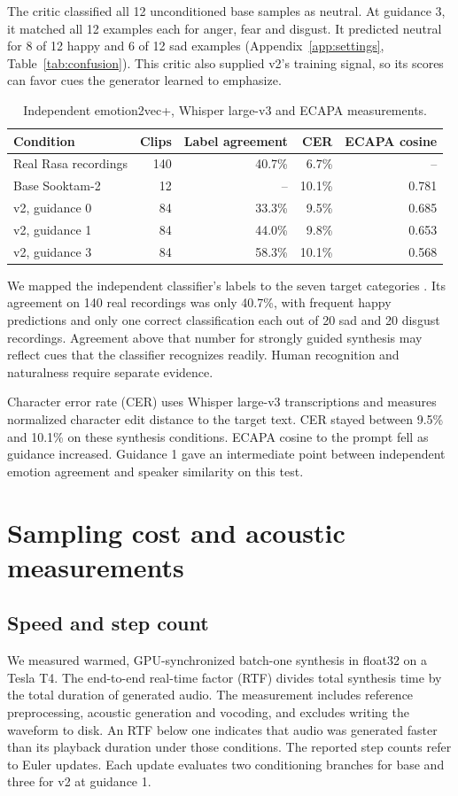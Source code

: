 \documentclass[11pt,a4paper]{article}
\newcommand{\sectionpage}[1]{\clearpage\section{#1}}
\begin{document}
The critic classified all 12 unconditioned base samples as neutral. At guidance 3, it matched all 12 examples each for anger, fear and disgust. It predicted neutral for 8 of 12 happy and 6 of 12 sad examples (Appendix~\ref{app:settings}, Table~\ref{tab:confusion}). This critic also supplied v2's training signal, so its scores can favor cues the generator learned to emphasize.

\begin{table}[!h]
\centering
\caption{Independent emotion2vec+, Whisper large-v3 and ECAPA measurements.}
\begin{tabular}{@{}lrrrr@{}}
\toprule
Condition & Clips & Label agreement & CER & ECAPA cosine \\
\midrule
Real Rasa recordings & 140 & 40.7\% & 6.7\% & -- \\
Base Sooktam-2 & 12 & -- & 10.1\% & 0.781 \\
v2, guidance 0 & 84 & 33.3\% & 9.5\% & 0.685 \\
v2, guidance 1 & 84 & 44.0\% & 9.8\% & 0.653 \\
v2, guidance 3 & 84 & 58.3\% & 10.1\% & 0.568 \\
\bottomrule
\end{tabular}
\end{table}

We mapped the independent classifier's labels to the seven target categories \cite{emotion2vec}. Its agreement on 140 real recordings was only 40.7\%, with frequent happy predictions and only one correct classification each out of 20 sad and 20 disgust recordings. Agreement above that number for strongly guided synthesis may reflect cues that the classifier recognizes readily. Human recognition and naturalness require separate evidence.

Character error rate (CER) uses Whisper large-v3 transcriptions \cite{whisper} and measures normalized character edit distance to the target text. CER stayed between 9.5\% and 10.1\% on these synthesis conditions. ECAPA cosine to the prompt \cite{ecapa,ecapamodel} fell as guidance increased. Guidance 1 gave an intermediate point between independent emotion agreement and speaker similarity on this test.

\sectionpage{Sampling cost and acoustic measurements}
\subsection{Speed and step count}
We measured warmed, GPU-synchronized batch-one synthesis in float32 on a Tesla T4. The end-to-end real-time factor (RTF) divides total synthesis time by the total duration of generated audio. The measurement includes reference preprocessing, acoustic generation and vocoding, and excludes writing the waveform to disk. An RTF below one indicates that audio was generated faster than its playback duration under those conditions. The reported step counts refer to Euler updates. Each update evaluates two conditioning branches for base and three for v2 at guidance 1.
\end{document}
